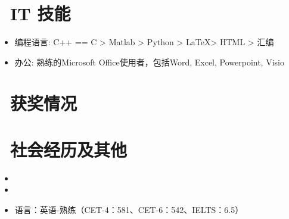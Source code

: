 \documentclass{resume}
\begin{document}

\section{\faCogs\ IT 技能}
\begin{itemize}[parsep=0.4ex]
  \item 编程语言: C++ == C > Matlab > Python > \LaTeX > HTML > 汇编
  \item 办公: 熟练的Microsoft Office使用者，包括Word, Excel, Powerpoint, Visio

\end{itemize}

\section{\faHeartO\ 获奖情况}

\section{\faInfo\ 社会经历及其他}
\begin{itemize}[parsep=0.4ex]
  \item {}
  \item {}
  \item 语言：英语-熟练（CET-4：581、CET-6：542、IELTS：6.5）

\end{itemize}

%
%
\end{document}
